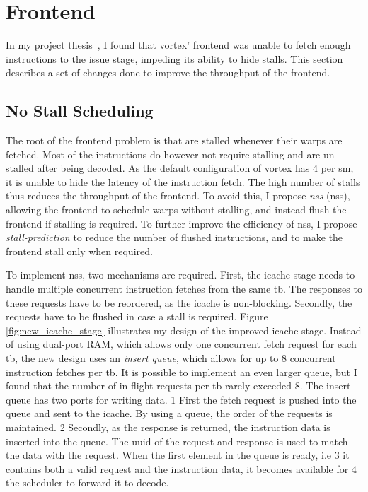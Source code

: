 \section{Frontend}

In my project thesis~\cite{Aurud_Project}, I found that \Gls{vortex}' frontend was unable to fetch enough instructions to the issue stage, impeding its ability to hide stalls. This section describes a set of changes done to improve the throughput of the frontend.

\subsection{No Stall Scheduling} \label{sec:no_stall_scheduling}

The root of the frontend problem is that  are stalled whenever their warps are fetched. Most of the instructions do however not require stalling and are un-stalled after being decoded. As the default configuration of \Gls{vortex} has 4  per \acrshort{sm}, it is unable to hide the latency of the instruction fetch. The high number of stalls thus reduces the throughput of the frontend. To avoid this, I propose \textit{\acrlong{nss}} (\acrshort{nss}), allowing the frontend to schedule warps without stalling, and instead flush the frontend if stalling is required. To further improve the efficiency of \acrshort{nss}, I propose \textit{stall-prediction} to reduce the number of flushed instructions, and to make the frontend stall only when required.

To implement \acrshort{nss}, two mechanisms are required. First, the icache-stage needs to handle multiple concurrent instruction fetches from the same \acrshort{tb}. The responses to these requests have to be reordered, as the icache is non-blocking. Secondly, the requests have to be flushed in case a stall is required. Figure \ref{fig:new_icache_stage} illustrates my design of the improved icache-stage. Instead of using dual-port RAM, which allows only one concurrent fetch request for each \acrshort{tb}, the new design uses an \textit{insert queue}, which allows for up to 8 concurrent instruction fetches per \acrshort{tb}. It is possible to implement an even larger queue, but I found that the number of in-flight requests per \acrshort{tb} rarely exceeded 8. The insert queue has two ports for writing data. \textcircled{\small{1}} First the fetch request is pushed into the queue and sent to the icache. By using a queue, the order of the requests is maintained. \textcircled{\small{2}} Secondly, as the response is returned, the instruction data is inserted into the queue. The \acrshort{uuid} of the request and response is used to match the data with the request. When the first element in the queue is ready, i.e \textcircled{\small{3}} it contains both a valid request and the instruction data, it becomes available for \textcircled{\small{4}} the scheduler to forward it to decode. 


